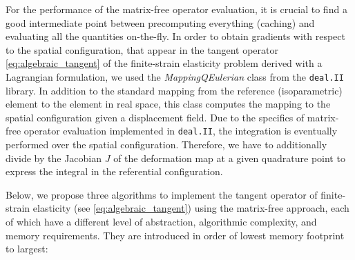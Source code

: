 \documentclass[AMA,STIX1COL]{WileyNJD-v2}
\begin{document}
For the performance of the matrix-free operator evaluation, it is crucial to find a good intermediate point between precomputing everything (caching) and evaluating all the quantities on-the-fly.
%
In order to obtain gradients with respect to the spatial configuration,
that appear in the tangent operator \eqref{eq:algebraic_tangent} of the finite-strain elasticity problem derived with a Lagrangian formulation,
we used the \textit{MappingQEulerian} class from the \texttt{deal.II} \cite{dealII90} library.
In addition to the standard mapping from the reference (isoparametric) element to the element in real space, this class computes the mapping to the spatial configuration given a displacement field.
%
Due to the specifics of matrix-free operator evaluation implemented in \texttt{deal.II}, the integration is eventually performed over the spatial configuration.
Therefore, we have to additionally divide by the Jacobian $J$ of the deformation map at a given quadrature point to express the integral in the referential configuration.

Below, we propose three algorithms to implement the tangent operator of finite-strain elasticity (see \eqref{eq:algebraic_tangent}) using the matrix-free approach, each of which have a different level of abstraction, algorithmic complexity, and memory requirements.
They are introduced in order of lowest memory footprint to largest:
\end{document}

